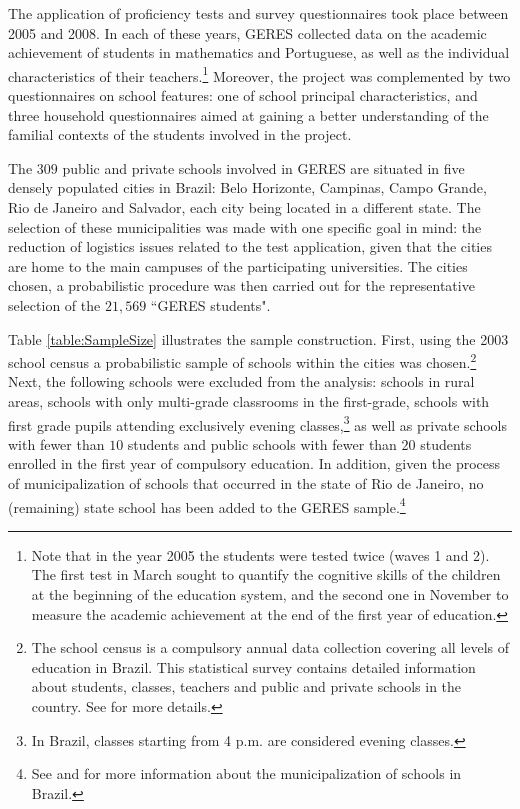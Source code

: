 \documentclass[a4paper, 12pt]{article}
\begin{document}
The application of proficiency tests and survey questionnaires took place between 2005 and 2008. In each of these years, GERES collected data on the academic achievement of students in mathematics and Portuguese, as well as the individual characteristics of their teachers.\footnote{Note that in the year 2005 the students were tested twice (waves 1 and 2). The first test in March sought to quantify the cognitive skills of the children at the beginning of the education system, and the second one in November to measure the academic achievement at the end of the first year of education.} Moreover, the project was complemented by two questionnaires on school features: one of school principal characteristics, and three household questionnaires aimed at gaining a better understanding of the familial contexts of the students involved in the project.


The $309$ public and private schools involved in GERES are situated in five densely populated cities in Brazil: Belo Horizonte, Campinas, Campo Grande, Rio de Janeiro and Salvador, each city being located in a different state. The selection of these municipalities was made with one specific goal in mind: the reduction of logistics issues related to the test application, given that the cities are home to the main campuses of the participating universities. The cities chosen, a probabilistic procedure was then carried out for the representative selection of the $21,569$ ``GERES students". 


Table \ref{table:SampleSize} illustrates the sample construction. First, using the 2003 school census a probabilistic sample of schools within the cities was chosen.\footnote{The school census is a compulsory annual data collection covering all levels of education in Brazil. This statistical survey contains detailed information about students, classes, teachers and public and private schools in the country. See \citet{diniz2007censo} for more details.} Next, the following schools were excluded from the analysis: schools in rural areas, schools with only multi-grade classrooms in the first-grade, schools with first grade pupils attending exclusively evening classes,\footnote{In Brazil, classes starting from 4 p.m. are considered evening classes.} as well as private schools with fewer than $10$ students and public schools with fewer than $20$ students enrolled in the first year of compulsory education. In addition, given the process of municipalization of schools that occurred in the state of Rio de Janeiro, no (remaining) state school has been added to the GERES sample.\footnote{See \citet{derqui2001educational} and \citet{dos1993recent} for more information about the municipalization of schools in Brazil.}
\end{document}
